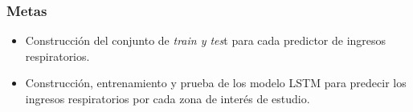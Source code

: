 \begin{frame}
	\frametitle{Metas}
	
	\begin{itemize}
		\item Construcción del conjunto de \textit{train y tes}t para cada predictor de ingresos respiratorios.
		\item Construcción, entrenamiento y prueba de los modelo LSTM para predecir los ingresos respiratorios por cada zona de interés de estudio.
		
	\end{itemize}
	
\end{frame}


